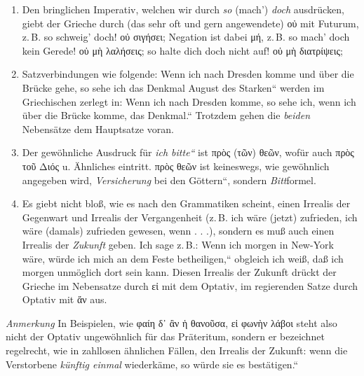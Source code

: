 \begin{enumerate}[leftmargin=0pt,rightmargin=0pt,listparindent =1cm,labelindent=1cm,labelsep=1ex,labelwidth={*},itemindent={*},align=left]
\item Den bringlichen Imperativ, welchen wir durch \emph{so} (mach') \emph{doch}
ausdrücken, giebt der Grieche durch (das sehr oft und gern angewendete)
\textgreek[variant=ancient]{οὐ} mit Futurum, z.\,B. so schweig' doch!
\textgreek[variant=ancient]{οὐ σιγήσει;} Negation ist dabei \textgreek[variant=ancient]{μή,}
z.\,B. so mach' doch kein Gerede! \textgreek[variant=ancient]{οὐ μὴ
λαλήσεις; }so halte dich doch nicht auf! \textgreek[variant=ancient]{οὐ
μὴ διατρίψεις;}
\item Satzverbindungen wie folgende: \quotedblbase Wenn ich nach Dresden
komme und über die Brücke gehe, so sehe ich das Denkmal August des
Starken`` werden im Griechischen zerlegt in: \quotedblbase Wenn
ich nach Dresden komme, so sehe ich, wenn ich über die Brücke komme,
das Denkmal.`` Trotzdem gehen die \emph{beiden} Nebensätze dem Hauptsatze
voran. 
\item Der gewöhnliche Ausdruck für \emph{\quotedblbase ich bitte``} ist
\textgreek[variant=ancient]{πρὸς (τῶν) θεῶν,} wofür auch \textgreek[variant=ancient]{πρὸς
τοῦ Διός} u. Ähnliches eintritt. \textgreek[variant=ancient]{πρὸς
θεῶν} ist keines\textcompwordmark{}wegs, wie gewöhnlich angegeben
wird, \emph{\quotedblbase Versicherung} bei den Göttern``, sondern
\emph{Bitt}formel.
\item Es giebt nicht bloß, wie es nach den Grammatiken scheint, einen Irrealis
der Gegenwart und Irrealis der Vergangenheit (z.\,B. ich wäre (jetzt)
zufrieden, ich wäre (damals) zufrieden gewesen, wenn . . .), sondern
es muß auch einen Irrealis der \emph{Zukunft} geben. Ich sage z.\,B.:
\quotedblbase Wenn ich morgen in New-York wäre, würde ich mich an
dem Feste betheiligen,`` obgleich ich weiß, daß ich morgen unmöglich
dort sein kann. Diesen Irrealis der Zukunft drückt der Grieche im
Nebensatze durch \textgreek[variant=ancient]{εἰ} mit dem Optativ,
im regierenden Satze durch Optativ mit \textgreek[variant=ancient]{ἄν}
aus. 
\end{enumerate}
\emph{Anmerkung} In Beispielen, wie \textgreek[variant=ancient]{φαίη
δ᾽ ἂν ἡ θανοῦσα, εἰ φωνὴν λάβοι} steht also nicht der Optativ ungewöhnlich
für das Präteritum, sondern er bezeichnet regelrecht, wie in zahllosen
ähnlichen Fällen, den Irrealis der Zukunft: \quotedblbase wenn die
Verstorbene \emph{künftig einmal} wiederkäme, so würde sie es bestätigen.`` 
